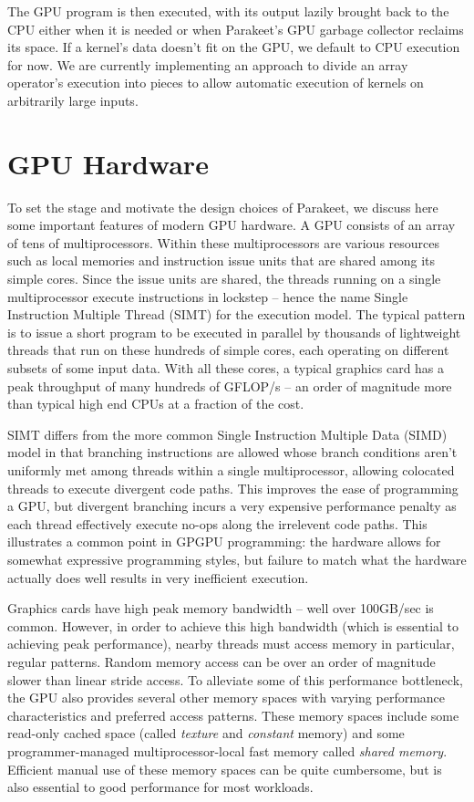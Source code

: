 \documentclass[preprint]{sigplanconf}
\begin{document}
The GPU program is then executed, with its output lazily brought back to the CPU either when it is needed or when Parakeet's GPU garbage collector reclaims its space. If a kernel's data doesn't fit on the GPU, we default to CPU execution for now.  We are currently implementing an approach to divide an array operator's execution into pieces to allow automatic execution of kernels on arbitrarily large inputs.

\section{GPU Hardware}
To set the stage and motivate the design choices of Parakeet, we discuss here some important features of modern GPU hardware.  A GPU consists of an array of tens of multiprocessors.  Within these multiprocessors are various resources such as local memories and instruction issue units that are shared among its simple cores. Since the issue units are shared, the threads running on a single multiprocessor execute instructions in lockstep -- hence the name Single Instruction Multiple Thread (SIMT) for the execution model.  The typical pattern is to issue a short program to be executed in parallel by thousands of lightweight threads that run on these hundreds of simple cores, each operating on different subsets of some input data.  With all these cores, a typical graphics card has a peak throughput of many hundreds of GFLOP/s -- an order of magnitude more than typical high end CPUs at a fraction of the cost.

SIMT differs from the more common Single Instruction Multiple Data (SIMD) model in that branching instructions are allowed whose branch conditions aren't uniformly met among threads within a single multiprocessor, allowing colocated threads to execute divergent code paths.  This improves the ease of programming a GPU, but divergent branching incurs a very expensive performance penalty as each thread effectively execute no-ops along the irrelevent code paths.  This illustrates a common point in GPGPU programming: the hardware allows for somewhat expressive programming styles, but failure to match what the hardware actually does well results in very inefficient execution.

Graphics cards have high peak memory bandwidth -- well over 100GB/sec is common.  However, in order to achieve this high bandwidth (which is essential to achieving peak performance), nearby threads must access memory in particular, regular patterns.  Random memory access can be over an order of magnitude slower than linear stride access.  To alleviate some of this performance bottleneck, the GPU also provides several other memory spaces with varying performance characteristics and preferred access patterns.  These memory spaces include some read-only cached space (called \emph{texture} and \emph{constant} memory) and some programmer-managed multiprocessor-local fast memory called \emph{shared memory}.  Efficient manual use of these memory spaces can be quite cumbersome, but is also essential to good performance for most workloads.
\end{document}

